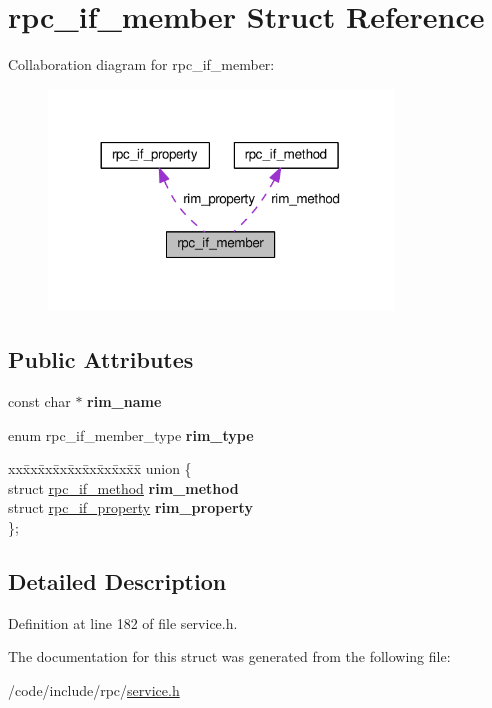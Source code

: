 \hypertarget{structrpc__if__member}{}\section{rpc\+\_\+if\+\_\+member Struct Reference}
\label{structrpc__if__member}


Collaboration diagram for rpc\+\_\+if\+\_\+member\+:
\nopagebreak
\begin{figure}[H]
\begin{center}
\leavevmode
\includegraphics[width=260pt]{structrpc__if__member__coll__graph}
\end{center}
\end{figure}
\subsection*{Public Attributes}
\begin{DoxyCompactItemize}
\item 
const char $\ast$ {\bfseries rim\+\_\+name}\hypertarget{structrpc__if__member_ad98804e4fe5438a8c5823c7623c6dab4}{}\label{structrpc__if__member_ad98804e4fe5438a8c5823c7623c6dab4}

\item 
enum rpc\+\_\+if\+\_\+member\+\_\+type {\bfseries rim\+\_\+type}\hypertarget{structrpc__if__member_a0ffdb5e81a707932149376d01c716b10}{}\label{structrpc__if__member_a0ffdb5e81a707932149376d01c716b10}

\item 
\begin{tabbing}
xx\=xx\=xx\=xx\=xx\=xx\=xx\=xx\=xx\=\kill
union \{\\
\>struct \hyperlink{structrpc__if__method}{rpc\_if\_method} {\bfseries rim\_method}\\
\>struct \hyperlink{structrpc__if__property}{rpc\_if\_property} {\bfseries rim\_property}\\
\}; \hypertarget{structrpc__if__member_a7c950b405b6852b3038ae847d0b7e2e0}{}\label{structrpc__if__member_a7c950b405b6852b3038ae847d0b7e2e0}
\\

\end{tabbing}\end{DoxyCompactItemize}


\subsection{Detailed Description}


Definition at line 182 of file service.\+h.



The documentation for this struct was generated from the following file\+:\begin{DoxyCompactItemize}
\item 
/code/include/rpc/\hyperlink{service_8h}{service.\+h}\end{DoxyCompactItemize}
